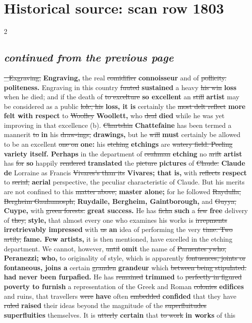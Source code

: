 \documentclass[10pt]{article}
\begin{document}
\section*{Historical source: scan row 1803}
\begin{multicols}{2}
\subsection*{\textit{continued from the previous page}}
\sout{\_Exgraving,} \textbf{Engraving,} the real \sout{comidifier} \textbf{connoisseur} and of \sout{pollicity.} \textbf{politeness.} Engraving in this country \sout{fuuted} \textbf{sustained} a heavy \sout{his win} \textbf{loss} when he died; and if the death of \sout{to excelture} \textbf{so excellent} an \sout{still} \textbf{artist} may be considered as a public \sout{lolc, his} \textbf{loss, it is} certainly the \sout{most delt reflect} \textbf{more felt with respect} to \sout{Woolley} \textbf{Woollett,} who \sout{deal} \textbf{died} while he was yet improving in that excellence (b). \sout{Chartshin} \textbf{Chattefaine} has been termed a mannerit \sout{to} \textbf{in} his \sout{draw-ings,} \textbf{drawings,} but he \sout{will} \textbf{must} certainly be allowed to be an excellent \sout{one on} \textbf{one:} his \sout{etching} \textbf{etchings} are \sout{watery field. Peeling} \textbf{variety itself. Perhaps} in the department of \sout{ceahman} \textbf{etching} no \sout{arilt} \textbf{artist} has \sout{for} \textbf{so} happily \sout{rendered} \textbf{translated} the \sout{picture} \textbf{pictures} of \sout{Claude.} \textbf{Claude de} Lorraine as Francis \sout{Vivares’s than its} \textbf{Vivares; that is,} with \sout{reflects} \textbf{respect} to \sout{serial,} \textbf{aerial} perspective, the peculiar characteristic of Claude. But his merits are not confined to this \sout{matter above,} \textbf{master alone;} for he followed \sout{Raydulla, Bergheim Gaulannosph,} \textbf{Ruydaile, Bergheim, Gaintborough,} and \sout{Guyya,} \textbf{Cuype,} with \sout{green forests.} \textbf{great success.} He has \sout{ficha} \textbf{such} a \sout{few} \textbf{free} delivery of \sout{they,} \textbf{style,} that almost every one who examines his works is \sout{irrepments} \textbf{irretrievably impressed} with \sout{us} \textbf{an} idea of performing the very \sout{time. Two artily,} \textbf{fame. Few artists,} it is then mentioned, have excelled in the etching department. We cannot, however, \sout{until} \textbf{omit} the name of \sout{Parnentes ywho,} \textbf{Peranezzi; who,} to originality of style, which is apparently \sout{fontuences, joints or} \textbf{fontaneous, joins a} certain \sout{granden} \textbf{grandeur} which \sout{between being stipulated.} \textbf{had never been furpafied.} He has \sout{remained} \textbf{trimmed} to \sout{perfectly in figured} \textbf{poverty to furnish} a representation of the Greek and Roman \sout{colonies} \textbf{edifices} and ruins, that travellers \sout{were} \textbf{have} often \sout{embedded} \textbf{confided} that they have \sout{ruled} \textbf{raised} their ideas beyond the magnitude of the \sout{superfluitudes} \textbf{superfluities} themselves. It is \sout{utterly} \textbf{certain} that \sout{to work} \textbf{in works} of this 
\end{multicols}
\end{document}
